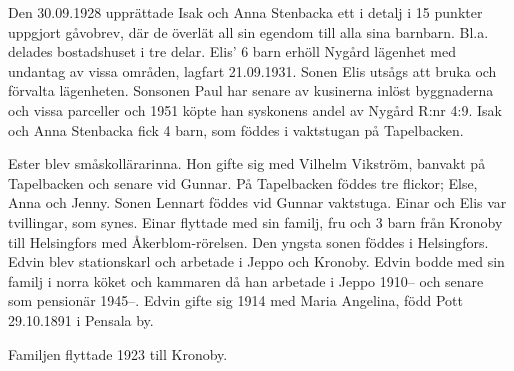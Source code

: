 Den 30.09.1928 upprättade Isak och Anna Stenbacka ett i detalj i 15 punkter uppgjort gåvobrev, där de överlät all sin egendom till alla sina barnbarn.  Bl.a. delades bostadshuset i tre delar. Elis' 6 barn erhöll Nygård lägenhet med undantag av vissa områden, lagfart 21.09.1931. Sonen Elis utsågs att bruka och förvalta lägenheten. Sonsonen Paul har senare av kusinerna inlöst byggnaderna och vissa parceller och 1951 köpte han syskonens andel av Nygård R:nr 4:9.
Isak och Anna Stenbacka fick 4 barn, som föddes i vaktstugan på Tapelbacken.
\begin{jhchildren}
  \item {}
  \item {}
  \item {}
  \item {}
\end{jhchildren}
Ester blev småskollärarinna. Hon gifte sig med Vilhelm Vikström, banvakt på Tapelbacken och senare vid Gunnar. På Tapelbacken föddes tre flickor; Else, Anna och Jenny. Sonen Lennart föddes vid Gunnar vaktstuga.
Einar och Elis var tvillingar, som synes. Einar flyttade med sin familj, fru och 3 barn från Kronoby till Helsingfors med Åkerblom-rörelsen. Den yngsta sonen föddes i Helsingfors. Edvin blev stationskarl och arbetade i Jeppo och Kronoby. Edvin bodde med sin familj i norra köket och kammaren då han arbetade i Jeppo 1910-- och senare som pensionär 1945--. Edvin gifte sig 1914 med Maria Angelina, född Pott 29.10.1891 i Pensala by.
\begin{jhchildren}
  \item {}
  \item {}
  \item {}
  \item {}
\end{jhchildren}
Familjen flyttade 1923 till Kronoby.

